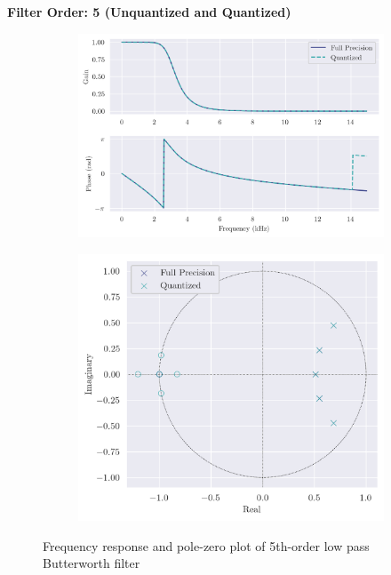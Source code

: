 \newpage
{\Large\textbf{Filter Order: 5 (Unquantized and Quantized)}}
\vfill

\begin{figure}[ht]
    \centering
    \begin{subfigure}[b]{0.56\textwidth}
        \centering
        \includegraphics[width=\textwidth]{images/q8_5th_freqz.png}
    \end{subfigure}
    \hfill
    \begin{subfigure}[b]{0.43\textwidth}
        \centering
        \includegraphics[width=\textwidth]{images/q8_5th_zp.png}
    \end{subfigure}
    \caption{Frequency response and pole-zero plot of 5th-order low pass Butterworth filter}
\end{figure}


